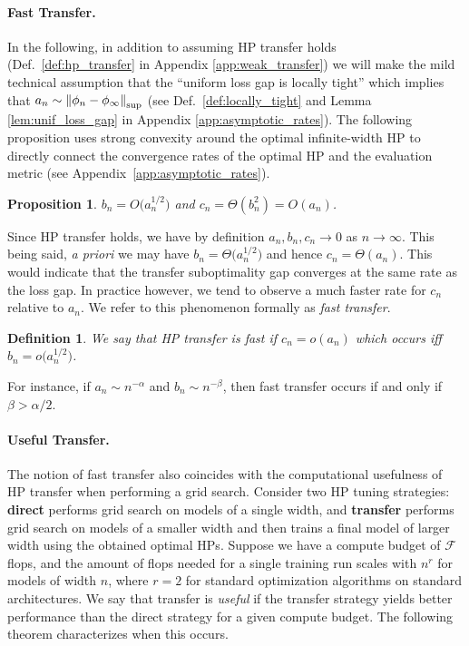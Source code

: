 \documentclass{article} %
\newtheorem{proposition}[theorem]{Proposition}
\newtheorem{definition}{Definition}
\newcommand{\compexp}{r}
\newcommand{\supnorm}[1]{\norm{#1}_{\mathrm{sup}}}
\newcommand{\flops}{\mathcal{F}}
\begin{document}
\paragraph{Fast Transfer.} In the following, in addition to assuming HP transfer holds (Def.\ \ref{def:hp_transfer} in Appendix \ref{app:weak_transfer}) we will make the mild technical assumption that the ``uniform loss gap is locally tight'' which implies that $a_n \sim \supnorm{\phi_n - \phi_\infty}$ (see Def.\ \ref{def:locally_tight} and Lemma \ref{lem:unif_loss_gap} in Appendix \ref{app:asymptotic_rates}). The following proposition uses strong convexity around the optimal infinite-width HP to directly connect the convergence rates of the optimal HP and the evaluation metric (see Appendix~\ref{app:asymptotic_rates}).
\begin{proposition}\label{prop:basic_rate}
     $b_n = O\big(a_n^{1 / 2}\big)$ and $c_n = \Theta(b_n^2) = O(a_n)$.
\end{proposition}
Since HP transfer holds, we have by definition $a_n, b_n, c_n \to 0$ as $n \to \infty$. This being said, \textit{a priori} we may have $b_n = \Theta\big(a_n^{1/2}\big)$ and hence $c_n = \Theta(a_n)$. This would indicate that the transfer suboptimality gap converges at the same rate as the loss gap. In practice however, we tend to observe a much faster rate for $c_n$ relative to $a_n$. We refer to this phenomenon formally as \textit{fast transfer}.
\begin{definition}
We say that HP transfer is fast if $c_n = o(a_n)$ which occurs iff $b_n = o\big(a_n^{1/2}\big)$.
    \label{def:fast-transfer}
\end{definition}
For instance, if $a_n \sim n^{-\alpha}$ and $b_n \sim n^{-\beta}$, then fast transfer occurs if and only if $ \beta > \alpha / 2$. 

\paragraph{Useful Transfer.} The notion of fast transfer also coincides with the computational usefulness of HP transfer when performing a grid search. Consider two HP tuning strategies: \textbf{direct} performs grid search on models of a single width, and \textbf{transfer} performs grid search on models of a smaller width and then trains a final model of larger width using the obtained optimal HPs.  
Suppose we have a compute budget of $\flops$ flops, and the amount of flops needed for a single training run scales with $n^{\compexp}$ for models of width $n$, where $\compexp = 2$ for standard optimization algorithms on standard architectures. 
We say that transfer is \textit{useful} if the transfer strategy yields better performance than the direct strategy for a given compute budget. The following theorem characterizes when this occurs. 
\end{document}
